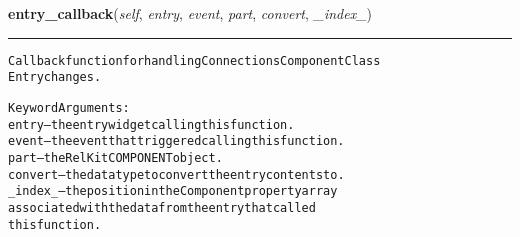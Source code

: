     \vspace{0.5ex}

\hspace{.8\funcindent}\begin{boxedminipage}{\funcwidth}

    \raggedright \textbf{entry\_callback}(\textit{self}, \textit{entry}, \textit{event}, \textit{part}, \textit{convert}, \textit{\_index\_})

    \vspace{-1.5ex}

    \rule{\textwidth}{0.5\fboxrule}
\setlength{\parskip}{2ex}
\begin{alltt}
Callback function for handling Connections Component Class
Entry changes.

Keyword Arguments:
  entry -- the entry widget calling this function.
  event -- the event that triggered calling this function.
   part -- the RelKit COMPONENT object.
convert -- the data type to convert the entry contents to.
\_index\_ -- the position in the Component property array
           associated with the data from the entry that called
           this function.
\end{alltt}

\setlength{\parskip}{1ex}
    \end{boxedminipage}

